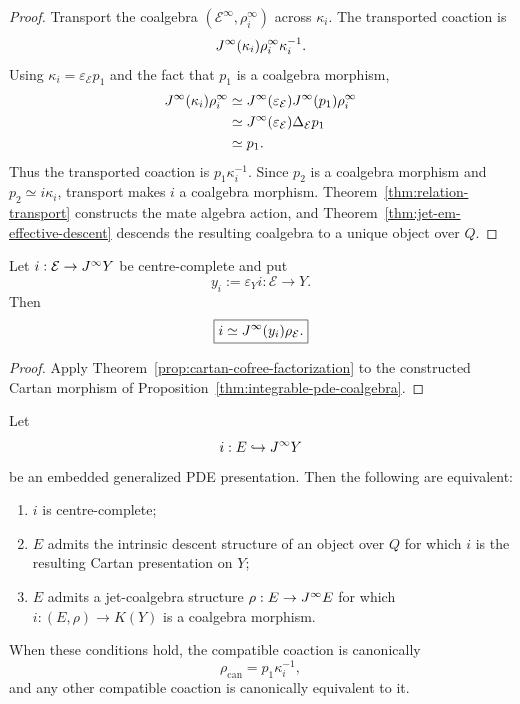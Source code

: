 \begin{proof}
Transport the coalgebra $(\mathcal E^\infty,\rho_i^\infty)$ across $\kappa_i$.  The transported coaction is
\[
    J^{\infty}(\kappa_i)\rho_i^\infty\kappa_i^{-1}.
\]
Using $\kappa_i=\varepsilon_{\mathcal E}p_1$ and the fact that $p_1$ is a coalgebra morphism,
\[
\begin{aligned}
J^{\infty}(\kappa_i)\rho_i^\infty
&\simeq
J^{\infty}(\varepsilon_{\mathcal E})J^{\infty}(p_1)\rho_i^\infty\\
&\simeq
J^{\infty}(\varepsilon_{\mathcal E})\Delta_{\mathcal E}p_1\\
&\simeq p_1.
\end{aligned}
\]
Thus the transported coaction is $p_1\kappa_i^{-1}$.  Since $p_2$ is a coalgebra morphism and $p_2\simeq i\kappa_i$, transport makes $i$ a coalgebra morphism.  Theorem~\ref{thm:relation-transport} constructs the mate algebra action, and Theorem~\ref{thm:jet-em-effective-descent} descends the resulting coalgebra to a unique object over $Q$.
\end{proof}

\begin{corollary}
\label{cor:integrable-presentation-factorization}
Let $i:\mathcal E\to J^{\infty} Y$ be centre-complete and put
\[
    y_i:=\varepsilon_Yi:\mathcal E\to Y.
\]
Then
\[
    \boxed{i\simeq J^{\infty}(y_i)\rho_{\mathcal E}.}
\]
\end{corollary}

\begin{proof}
Apply Theorem~\ref{prop:cartan-cofree-factorization} to the constructed Cartan morphism of Proposition~\ref{thm:integrable-pde-coalgebra}.
\end{proof}

\begin{corollary}
\label{cor:embedded-pde-recognition}
Let
\[
    i:E\hookrightarrow J^{\infty} Y
\]
be an embedded generalized PDE presentation.  Then the following are equivalent:
\begin{enumerate}
\item $i$ is centre-complete;
\item $E$ admits the intrinsic descent structure of an object over $Q$ for which $i$ is the resulting Cartan presentation on $Y$;
\item $E$ admits a jet-coalgebra structure $\rho:E\to J^{\infty} E$ for which $i:(E,\rho)\to K(Y)$ is a coalgebra morphism.
\end{enumerate}
When these conditions hold, the compatible coaction is canonically
\[
    \rho_{\mathrm{can}}=p_1\kappa_i^{-1},
\]
and any other compatible coaction is canonically equivalent to it.
\end{corollary}

